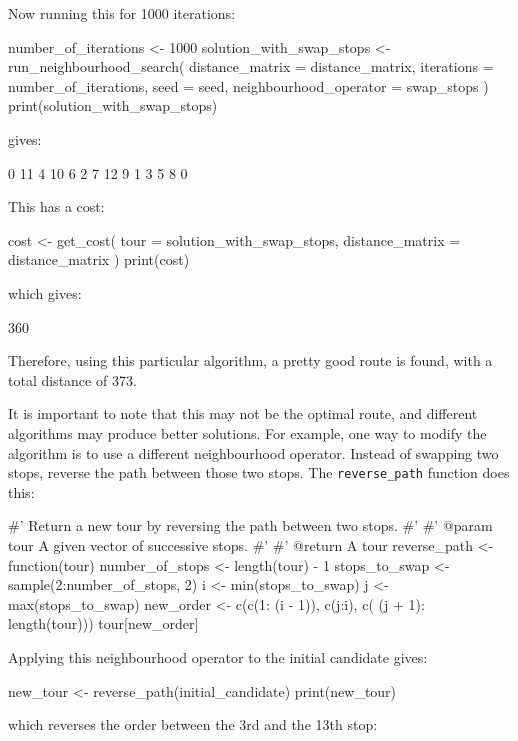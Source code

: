 Now running this for 1000 iterations:

\begin{Rin}
number_of_iterations <- 1000
solution_with_swap_stops <- run_neighbourhood_search(
  distance_matrix = distance_matrix,
  iterations = number_of_iterations,
  seed = seed,
  neighbourhood_operator = swap_stops
)
print(solution_with_swap_stops)
\end{Rin}

gives:

\begin{Rout}
 [1]  0 11  4 10  6  2  7 12  9  1  3  5  8  0
\end{Rout}

This has a cost:

\begin{Rin}
cost <- get_cost(
  tour = solution_with_swap_stops,
  distance_matrix = distance_matrix
)
print(cost)
\end{Rin}

which gives:

\begin{Rout}
[1] 360
\end{Rout}

Therefore, using this particular algorithm, a pretty good route is found, with a
total distance of 373.

It is important to note that this may not be the optimal route, and different algorithms
 may produce better solutions.
For example, one way to modify the algorithm is to use a different neighbourhood operator.
Instead of swapping two stops, reverse the path between those two
stops. The \texttt{reverse_path} function does this:


\begin{Rin}
#' Return a new tour by reversing the path between two stops.
#'
#' @param tour A given vector of successive stops.
#'
#' @return A tour
reverse_path <- function(tour){
  number_of_stops <- length(tour) - 1
  stops_to_swap <- sample(2:number_of_stops, 2)
  i <- min(stops_to_swap)
  j <- max(stops_to_swap)
  new_order <- c(c(1: (i - 1)), c(j:i), c( (j + 1): length(tour)))
  tour[new_order]
}
\end{Rin}

Applying this neighbourhood operator to the initial candidate gives:

\begin{Rin}
new_tour <- reverse_path(initial_candidate)
print(new_tour)
\end{Rin}

which reverses the order
between the 3rd and the 13th stop:

